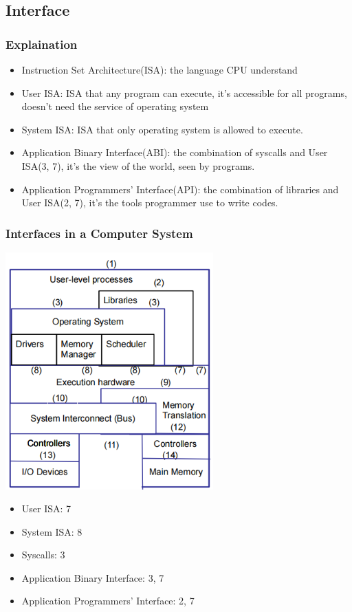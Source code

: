 \documentclass[12pt]{article}
\begin{document}
\subsection{Interface}
\subsubsection{Explaination}
\begin{itemize}
    \item Instruction Set Architecture(ISA): the language CPU understand
    \item User ISA: ISA that any program can execute, it's accessible for all programs, doesn't need the service of operating system
    \item System ISA: ISA that only operating system is allowed to execute.
    \item Application Binary Interface(ABI): the combination of syscalls and User ISA(3, 7), it's the view of the world, seen by programs.
    \item Application Programmers' Interface(API): the combination of libraries and User ISA(2, 7), it's the tools programmer use to write codes.
\end{itemize}
\subsubsection{Interfaces in a Computer System}
\includegraphics[width=0.6\textwidth]{InterfacesInComputerSystem.png}
\begin{itemize}
    \item User ISA: 7
    \item System ISA: 8
    \item Syscalls: 3
    \item Application Binary Interface: 3, 7
    \item Application Programmers' Interface: 2, 7
\end{itemize}
\end{document}
